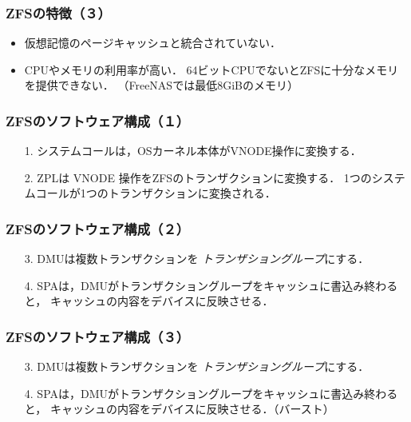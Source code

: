 \documentclass{beamer}                   %
\begin{document}
\begin{frame}
  \frametitle{ZFSの特徴（３）}
  \begin{itemize}
  \item 仮想記憶のページキャッシュと統合されていない．
  \item CPUやメモリの利用率が高い．
    64ビットCPUでないとZFSに十分なメモリを提供できない．
    （FreeNASでは最低8GiBのメモリ）
  \end{itemize}
  \vfill
\end{frame}

\begin{frame}[fragile]
  \frametitle{ZFSのソフトウェア構成（１）}
  \begin{enumerate}
  \item[1.] システムコールは，OSカーネル本体がVNODE操作に変換する．
  \item[2.] ZPLは VNODE 操作をZFSのトランザクションに変換する．
    1つのシステムコールが1つのトランザクションに変換される．
  \end{enumerate}  
  \vfill
\end{frame}

\begin{frame}[fragile]
  \frametitle{ZFSのソフトウェア構成（２）}
  \begin{enumerate}
  \item[3.] DMUは複数トランザクションを
    \emph{トランザショングループ}にする．
  \item[4.] SPAは，DMUがトランザクショングループをキャッシュに書込み終わると，
    キャッシュの内容をデバイスに反映させる．
  \end{enumerate}  
  \vfill
\end{frame}

\begin{frame}[fragile]
  \frametitle{ZFSのソフトウェア構成（３）}
  \begin{enumerate}
  \item[3.] DMUは複数トランザクションを
    \emph{トランザショングループ}にする．
  \item[4.] SPAは，DMUがトランザクショングループをキャッシュに書込み終わると，
    キャッシュの内容をデバイスに反映させる．（バースト）
  \end{enumerate}  
  \vfill
\end{frame}
\end{document}
